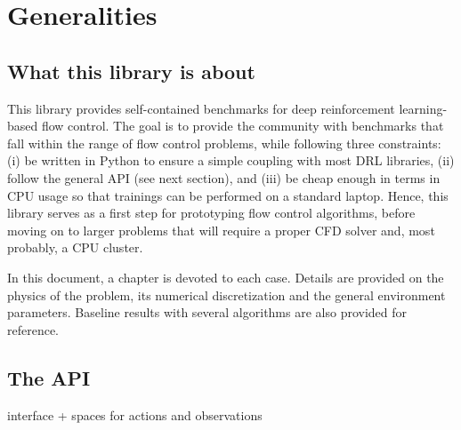 \chapter{Generalities}

\section{What this library is about}

This library provides self-contained benchmarks for deep reinforcement learning-based flow control. The goal is to provide the community with benchmarks that fall within the range of flow control problems, while following three constraints: (i) be written in Python to ensure a simple coupling with most DRL libraries, (ii) follow the general \gym API (see next section), and (iii) be cheap enough in terms in CPU usage so that trainings can be performed on a standard laptop. Hence, this library serves as a first step for prototyping flow control algorithms, before moving on to larger problems that will require a proper CFD solver and, most probably, a CPU cluster.

In this document, a chapter is devoted to each case. Details are provided on the physics of the problem, its numerical discretization and the general environment parameters. Baseline results with several algorithms are also provided for reference.

\section{The \gym API}

interface + spaces for actions and observations
